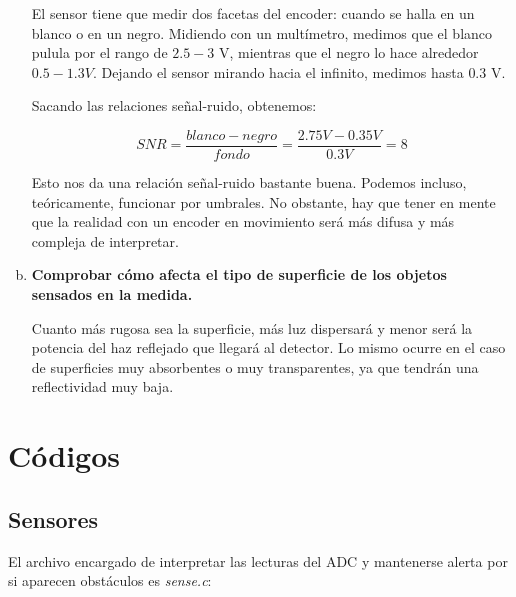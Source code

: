 \documentclass[11pt, a4paper]{article}
\begin{document}
\begin{enumerate}[(a)]
			El sensor tiene que medir dos facetas del encoder: cuando se halla en un blanco o en un negro. Midiendo con un multímetro, medimos que el blanco pulula por el rango de $2.5 - 3$ V, mientras que el negro lo hace alrededor $0.5 - 1.3 V$. Dejando el sensor mirando hacia el infinito, medimos hasta $0.3$ V.
			
			Sacando las relaciones señal-ruido, obtenemos:
			
			$$ SNR = \dfrac{blanco - negro}{fondo} = \dfrac{2.75 V - 0.35 V}{0.3 V} = 8 $$
			
			Esto nos da una relación señal-ruido bastante buena. Podemos incluso, teóricamente, funcionar por umbrales. No obstante, hay que tener en mente que la realidad con un encoder en movimiento será más difusa y más compleja de interpretar.
			
			\item \textbf{Comprobar cómo afecta el tipo de superficie de los objetos sensados en la medida.}
	
			Cuanto más rugosa sea la superficie, más luz dispersará y menor será la potencia del haz reflejado que llegará al detector. Lo mismo ocurre en el caso de superficies muy absorbentes o muy transparentes, ya que tendrán una reflectividad muy baja.
			
			\end{enumerate}
			
\section{Códigos}
	\subsection{Sensores}
	 El archivo encargado de interpretar las lecturas del ADC y mantenerse alerta por si aparecen obstáculos es \textit{sense.c}:
	 
\end{document}
